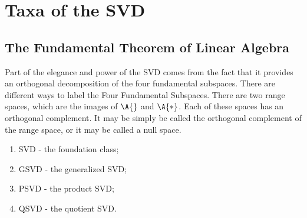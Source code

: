 \chapter{Taxa of the SVD}

\section[The Fundamental Theorem]{The Fundamental Theorem of Linear Algebra}
Part of the elegance and power of the SVD comes from the fact that it provides an orthogonal decomposition of the four fundamental subspaces. There are different ways to label the Four Fundamental Subspaces. There are two range spaces, which are the images of $\A{}$ and $\A{*}$. Each of these spaces has an orthogonal complement. It may be simply be called the orthogonal complement of the range space, or it may be called a null space.

\begin{enumerate}
\item SVD - the foundation class;
\item GSVD - the generalized SVD;
\item PSVD - the product SVD;
\item QSVD - the quotient SVD.
\end{enumerate}


\endinput